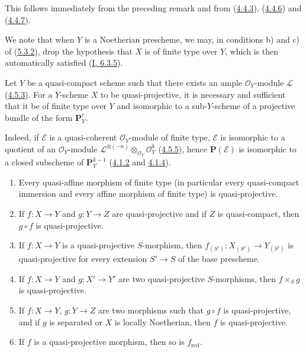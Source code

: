 This follows immediately from the preceding remark and from
(\hyperref[II.4.4.3]{4.4.3}), (\hyperref[II.4.4.6]{4.4.6}) and
(\hyperref[II.4.4.7]{4.4.7}).

We note that when $Y$ is a Noetherian prescheme, we may, in
conditions b) and c) of (\hyperref[II.5.3.2]{5.3.2}), drop the
hypothesis that $X$ is of finite type over $Y$, which is then automatically
satisfied (\hyperref[I.6.3.5]{I, 6.3.5}).

\begin{corollary}[5.3.3]
\label{II.5.3.3}
Let $Y$ be a quasi-compact scheme such that there exists an ample
$\mathcal{O}_Y$-module $\mathcal{L}$ (\hyperref[II.4.5.3]{4.5.3}). For a
$Y$-scheme $X$ to be quasi-projective, it is necessary and sufficient that it
be of finite type over $Y$ and isomorphic to a sub-$Y$-scheme of a projective
bundle of the form $\mathbf{P}_Y^r$.
\end{corollary}

Indeed, if $\mathcal{E}$ is a quasi-coherent $\mathcal{O}_Y$-module of
finite type, $\mathcal{E}$ is isomorphic to a quotient of an
$\mathcal{O}_Y$-module
$\mathcal{L}^{\otimes(-n)}\otimes_{\mathcal{O}_Y}\mathcal{O}_Y^k$
(\hyperref[II.4.5.5]{4.5.5}), hence $\mathbf{P}(\mathcal{E})$ is
isomorphic to a closed subscheme of $\mathbf{P}_Y^{k-1}$
(\hyperref[II.4.1.2]{4.1.2} and \hyperref[II.4.1.4]{4.1.4}).

\begin{proposition}[5.3.4]
\label{II.5.3.4}
\begin{enumerate}
  \item[\rm{(i)}] Every quasi-affine morphism of finite type (in particular every
  quasi-compact immersion and every affine morphism of finite type) is
  quasi-projective.
  \item[\rm{(ii)}] If $f:X\to Y$ and $g:Y\to Z$ are quasi-projective and if
  $Z$ is quasi-compact, then $g\circ f$ is quasi-projective.


  \item[\rm{(iii)}] If $f:X\to Y$ is a quasi-projective $S$-morphism, then
  $f_{(S')}:X_{(S')}\to Y_{(S')}$ is quasi-projective for every extension
  $S'\to S$ of the base prescheme.
  \item[\rm{(iv)}] If $f:X\to Y$ and $g:X'\to Y'$ are two quasi-projective
  $S$-morphisms, then $f\times_Sg$ is quasi-projective.
  \item[\rm{(v)}] If $f:X\to Y$, $g:Y\to Z$ are two morphisms such that
  $g\circ f$ is quasi-projective, and if $g$ is separated or $X$ is locally
  Noetherian, then $f$ is quasi-projective.
  \item[\rm{(vi)}] If $f$ is a quasi-projective morphism, then so is
  $f_{\mathrm{red}}$.
\end{enumerate}
\end{proposition}

